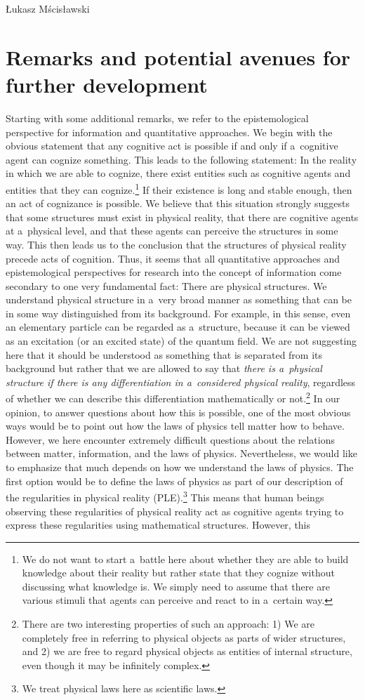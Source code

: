 \begin{artengenv}{Łukasz Mścisławski}
\section{Remarks and potential avenues for further development}
Starting with some additional remarks, we refer to the epistemological perspective for information and quantitative approaches. We begin with the obvious statement that any cognitive act is possible if and only if a~cognitive agent can cognize something. This leads to the following statement: In the reality in which we are able to cognize, there exist entities such as cognitive agents and entities that they can cognize.\footnote{We do not want to start a~battle here about whether they are able to build knowledge about their reality but rather state that they cognize without discussing what knowledge is. We simply need to assume that there are various stimuli that agents can perceive and react to in a~certain way.} If their existence is long and stable enough, then an act of cognizance is possible. We believe that this situation strongly suggests that some structures must exist in physical reality, that there are cognitive agents at a~physical level, and that these agents can perceive the structures in some way. This then leads us to the conclusion that the structures of physical reality precede acts of cognition. Thus, it seems that all quantitative approaches and epistemological perspectives for research into the concept of information come secondary to one very fundamental fact: There are physical structures. We understand physical structure in a~very broad manner as something that can be in some way distinguished from its background. For example, in this sense, even an elementary particle can be regarded as a~structure, because it can be viewed as an excitation (or an excited state) of the quantum field. We are not suggesting here that it should be understood as something that is separated from its background but rather that we are allowed to say that \textit{there is a~physical structure if there is any differentiation in a~considered physical reality}, regardless of whether we can describe this differentiation mathematically or not.\footnote{There are two interesting properties of such an approach: 1) We are completely free in referring to physical objects as parts of wider structures, and 2) we are free to regard physical objects as entities of internal structure, even though it may be infinitely complex.} In our opinion, to answer questions about how this is possible, one of the most obvious ways would be to point out how the laws of physics tell matter how to behave. However, we here encounter extremely difficult questions about the relations between matter, information, and the laws of physics. Nevertheless, we would like to emphasize that much depends on how we understand the laws of physics. The first option would be to define the laws of physics as part of our description of the regularities in physical reality (PLE).\footnote{We treat physical laws here as scientific laws.} This means that human beings observing these regularities of physical reality act as cognitive agents trying to express these regularities using mathematical structures. However, this 
\end{artengenv}
